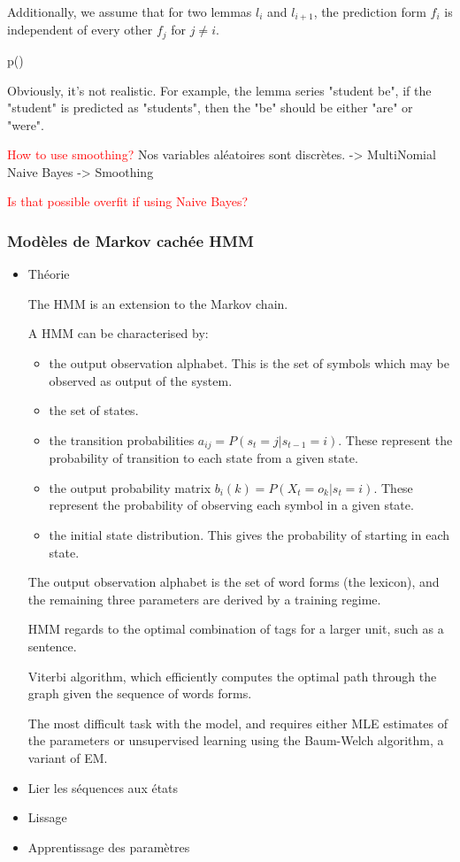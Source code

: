 \documentclass[a4paper]{article}
\begin{document}
Additionally, we assume that for two lemmas $l_i$ and $l_{i+1}$, the prediction form $f_{i}$ is independent of every other $f_{j}$ for $j \neq i$.

p()


Obviously, it's not realistic. For example, the lemma series "student be", if the "student" is predicted as "students", then the "be" should be either "are" or "were". 



\textcolor{red}{How to use smoothing?}
{ Nos variables aléatoires sont discrètes. -> MultiNomial Naive Bayes -> Smoothing}

\textcolor{red}{Is that possible overfit if using Naive Bayes?}

\subsubsection{Modèles de Markov cachée HMM}
\begin{itemize}
\item Théorie

The HMM is an extension to the Markov chain.



A HMM can be characterised by:
\begin{itemize}
\item the output observation alphabet. This is the set of symbols which may be observed as output of the system.
\item the set of states.
\item the transition probabilities $a_{ij} = P(s_t = j | s_{t-1} = i)$. These represent the probability of transition to each state from a given state.
\item the output probability matrix $b_i(k) = P(X_t = o_k | s_t = i)$. These represent the probability of observing each symbol in a given state.
\item the initial state distribution. This gives the probability of starting in each state.
\end{itemize}

The output observation alphabet is the set of word forms (the lexicon), and the 
remaining three parameters are derived by a training regime.

HMM regards to the optimal combination of tags for a larger unit, such as a sentence.

Viterbi algorithm, which efficiently computes the optimal path through the graph given the sequence of words forms.

The most difficult task with the model, and requires either MLE estimates of the parameters or unsupervised learning using the Baum-Welch algorithm, a variant of EM.


\item Lier les séquences aux états
\item Lissage
\item Apprentissage des paramètres
\end{itemize}
\end{document}

